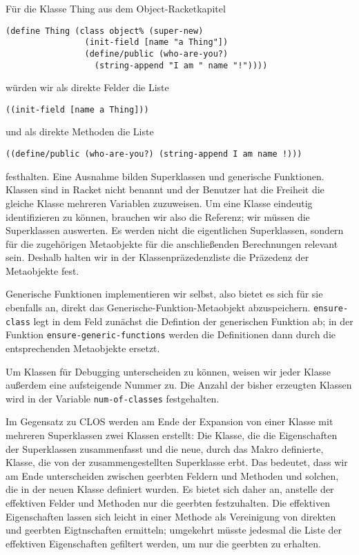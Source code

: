 Für die Klasse Thing aus dem Object-Racketkapitel

\begin{lstlisting}
(define Thing (class object% (super-new)
                (init-field [name "a Thing"])
                (define/public (who-are-you?) 
                  (string-append "I am " name "!"))))
\end{lstlisting}

würden wir als direkte Felder die Liste 

\texttt{{\textquotesingle}((init-field [name {\qq}a Thing\qq]))} 

und als direkte Methoden die Liste 

\texttt{{\textquotesingle}((define/public (who-are-you?) (string-append {\qq}I am {\qq} name \qq!\qq)))} 

festhalten. Eine Ausnahme bilden Superklassen und generische Funktionen. Klassen sind in Racket nicht benannt und der Benutzer hat die Freiheit die gleiche Klasse mehreren Variablen zuzuweisen. Um eine Klasse eindeutig identifizieren zu können, brauchen wir also die Referenz; wir müssen die Superklassen auswerten. Es werden nicht die eigentlichen Superklassen, sondern für die zugehörigen Metaobjekte für die anschließenden Berechnungen relevant sein. Deshalb halten wir in der Klassenpräzedenzliste die Präzedenz der Metaobjekte fest. 

Generische Funktionen implementieren wir selbst, also bietet es sich für sie ebenfalls an, direkt das Generische-Funktion-Metaobjekt abzuspeichern. \texttt{ensure-class} legt in dem Feld zunächst die Defintion der generischen Funktion ab; in der Funktion \texttt{ensure-generic-functions} werden die Definitionen dann durch die entsprechenden Metaobjekte ersetzt.

Um Klassen für Debugging unterscheiden zu können, weisen wir jeder Klasse außerdem eine aufsteigende Nummer zu. Die Anzahl der bisher erzeugten Klassen wird in der Variable \texttt{num-of-classes} festgehalten.

Im Gegensatz zu CLOS werden am Ende der Expansion von einer Klasse mit mehreren Superklassen zwei Klassen erstellt: Die Klasse, die die Eigenschaften der Superklassen zusammenfasst und die neue, durch das Makro definierte, Klasse, die von der zusammengestellten Superklasse erbt. Das bedeutet, dass wir am Ende unterscheiden zwischen geerbten Feldern und Methoden und solchen, die in der neuen Klasse definiert wurden. Es bietet sich daher an, anstelle der effektiven Felder und Methoden nur die geerbten festzuhalten. Die effektiven Eigenschaften lassen sich leicht in einer Methode als Vereinigung von direkten und geerbten Eigtnschaften ermitteln; umgekehrt müsste jedesmal die Liste der effektiven Eigenschaften gefiltert werden, um nur die geerbten zu erhalten. 

